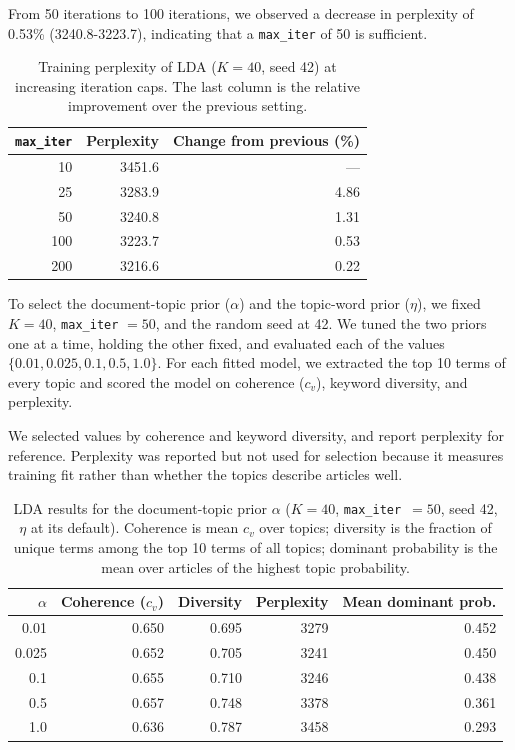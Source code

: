 \documentclass[conference]{IEEEtran}
\begin{document}
From 50 iterations to 100 iterations, we observed a decrease in perplexity of 0.53\% (3240.8-3223.7), indicating that a \texttt{max\_iter} of 50 is sufficient. 

\begin{table}[ht]
\centering
\caption{Training perplexity of LDA ($K=40$, seed 42) at increasing iteration caps. The last column is the relative improvement over the previous setting.}
\label{tab:max-iter}
\begin{tabular}{rrr}
\hline
\texttt{max\_iter} & Perplexity & Change from previous (\%) \\
\hline
10  & 3451.6 & --- \\
25  & 3283.9 & 4.86 \\
50  & 3240.8 & 1.31 \\
100 & 3223.7 & 0.53 \\
200 & 3216.6 & 0.22 \\
\hline
\end{tabular}
\end{table}

To select the document-topic prior ($\alpha$) and the topic-word prior ($\eta$), we fixed $K = 40$, \texttt{max\_iter} $= 50$, and the random seed at 42. We tuned the two priors one at a time, holding the other fixed, and evaluated each of the values $\{0.01, 0.025, 0.1, 0.5, 1.0\}$. For each fitted model, we extracted the top 10 terms of every topic and scored the model on coherence ($c_v$), keyword diversity, and perplexity.

We selected values by coherence and keyword diversity, and report perplexity for reference. Perplexity was reported but not used for selection because it measures training fit rather than whether the topics describe articles well.

\begin{table}[ht]
\centering
\caption{LDA results for the document-topic prior $\alpha$ ($K=40$, \texttt{max\_iter}~$=50$, seed 42, $\eta$ at its default). Coherence is mean $c_v$ over topics; diversity is the fraction of unique terms among the top 10 terms of all topics; dominant probability is the mean over articles of the highest topic probability.}
\label{tab:alpha}
\setlength{\tabcolsep}{4pt}
\begin{tabular}{rrrrr}
\hline
$\alpha$ & Coherence ($c_v$) & Diversity & Perplexity & Mean dominant prob. \\
\hline
0.01  & 0.650 & 0.695 & 3279 & 0.452 \\
0.025 & 0.652 & 0.705 & 3241 & 0.450 \\
0.1   & 0.655 & 0.710 & 3246 & 0.438 \\
0.5   & 0.657 & 0.748 & 3378 & 0.361 \\
1.0   & 0.636 & 0.787 & 3458 & 0.293 \\
\hline
\end{tabular}
\end{table}
\end{document}
